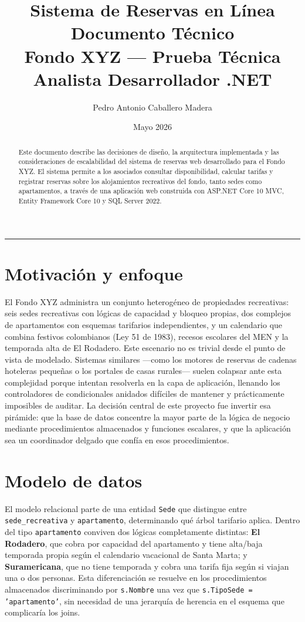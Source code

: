 \documentclass[12pt, letterpaper]{article}
\title{%
  \textbf{\textcolor{fodunred}{Sistema de Reservas en Línea}}\\[0.4em]
  \large Documento Técnico\\[0.2em]
  \normalsize Fondo XYZ --- Prueba Técnica Analista Desarrollador .NET
}
\author{Pedro Antonio Caballero Madera}
\date{Mayo 2026}
\begin{document}
\maketitle
\thispagestyle{fancy}

\begin{abstract}
\noindent
Este documento describe las decisiones de diseño, la arquitectura implementada y las consideraciones de escalabilidad del sistema de reservas web desarrollado para el Fondo XYZ. El sistema permite a los asociados consultar disponibilidad, calcular tarifas y registrar reservas sobre los alojamientos recreativos del fondo, tanto sedes como apartamentos, a través de una aplicación web construida con ASP.NET Core 10 MVC, Entity Framework Core 10 y SQL Server 2022.
\end{abstract}

\vspace{1em}
\hrule
\vspace{2em}

\onehalfspacing

\section{Motivación y enfoque}

El Fondo XYZ administra un conjunto heterogéneo de propiedades recreativas: seis sedes recreativas con lógicas de capacidad y bloqueo propias, dos complejos de apartamentos con esquemas tarifarios independientes, y un calendario que combina festivos colombianos (Ley 51 de 1983), recesos escolares del MEN y la temporada alta de El Rodadero. Este escenario no es trivial desde el punto de vista de modelado. Sistemas similares ---como los motores de reservas de cadenas hoteleras pequeñas o los portales de casas rurales--- suelen colapsar ante esta complejidad porque intentan resolverla en la capa de aplicación, llenando los controladores de condicionales anidados difíciles de mantener y prácticamente imposibles de auditar. La decisión central de este proyecto fue invertir esa pirámide: que la base de datos concentre la mayor parte de la lógica de negocio mediante procedimientos almacenados y funciones escalares, y que la aplicación sea un coordinador delgado que confía en esos procedimientos.

\section{Modelo de datos}

El modelo relacional parte de una entidad \texttt{Sede} que distingue entre \texttt{sede\_recreativa} y \texttt{apartamento}, determinando qué árbol tarifario aplica. Dentro del tipo \texttt{apartamento} conviven dos lógicas completamente distintas: \textbf{El Rodadero}, que cobra por capacidad del apartamento y tiene alta/baja temporada propia según el calendario vacacional de Santa Marta; y \textbf{Suramericana}, que no tiene temporada y cobra una tarifa fija según si viajan una o dos personas. Esta diferenciación se resuelve en los procedimientos almacenados discriminando por \texttt{s.Nombre} una vez que \texttt{s.TipoSede = 'apartamento'}, sin necesidad de una jerarquía de herencia en el esquema que complicaría los joins.
\end{document}
